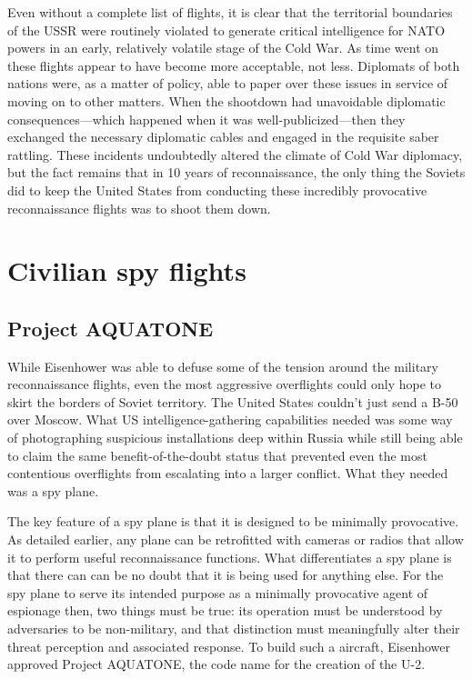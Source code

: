 \documentclass{report}
\begin{document}
\begin{refsegment}
Even without a complete list of flights, it is clear that the territorial boundaries of the USSR were routinely violated to generate critical intelligence for NATO powers in an early, relatively volatile stage of the Cold War. As time went on these flights appear to have become more acceptable, not less. Diplomats of both nations were, as a matter of policy, able to paper over these issues in service of moving on to other matters. When the shootdown had unavoidable diplomatic consequences---which happened when it was well-publicized---then they exchanged the necessary diplomatic cables and engaged in the requisite saber rattling. These incidents undoubtedly altered the climate of Cold War diplomacy, but the fact remains that in 10 years of reconnaissance, the only thing the Soviets did to keep the United States from conducting these incredibly provocative reconnaissance flights was to shoot them down.


\section{Civilian spy flights}
\subsection{Project AQUATONE}
While Eisenhower was able to defuse some of the tension around the military reconnaissance flights, even the most aggressive overflights could only hope to skirt the borders of Soviet territory. The United States couldn't just send a B-50 over Moscow. What US intelligence-gathering capabilities needed was some way of photographing suspicious installations deep within Russia while still being able to claim the same benefit-of-the-doubt status that prevented even the most contentious overflights from escalating into a larger conflict. What they needed was a spy plane.

The key feature of a spy plane is that it is designed to be minimally provocative. As detailed earlier, any plane can be retrofitted with cameras or radios that allow it to perform useful reconnaissance functions. What differentiates a spy plane is that there can can be no doubt that it is being used for anything else. For the spy plane to serve its intended purpose as a minimally provocative agent of espionage then, two things must be true: its operation must be understood by adversaries to be non-military, and that distinction must meaningfully alter their threat perception and associated response. To build such a aircraft, Eisenhower approved Project AQUATONE, the code name for the creation of the U-2.


\end{refsegment}
\end{document}
